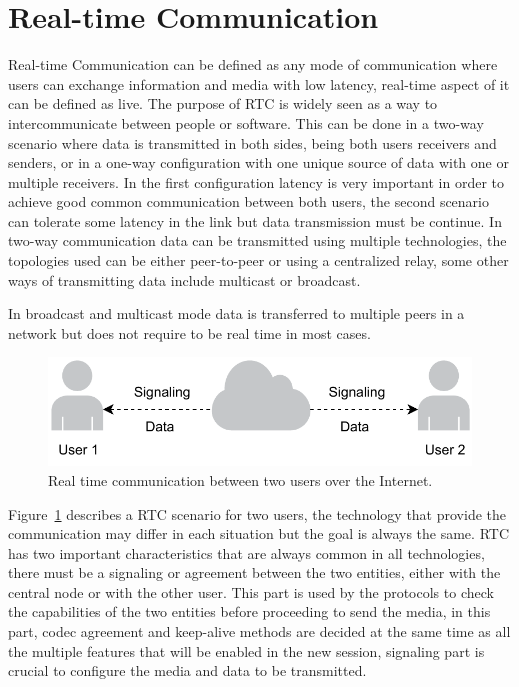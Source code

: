 \section{Real-time Communication}

\thispagestyle{empty}

Real-time Communication can be defined as any mode of communication where users can exchange information and media with low latency, real-time aspect of it can be defined as live. The purpose of RTC is widely seen as a way to intercommunicate between people or software. This can be done in a two-way scenario where data is transmitted in both sides, being both users receivers and senders, or in a one-way configuration with one unique source of data with one or multiple receivers. In the first configuration latency is very important in order to achieve good common communication between both users, the second scenario can tolerate some latency in the link but data transmission must be continue. In two-way communication data can be transmitted using multiple technologies, the topologies used can be either peer-to-peer or using a centralized relay, some other ways of transmitting data include multicast or broadcast.

In broadcast and multicast mode data is transferred to multiple peers in a network but does not require to be real time in most cases.

\begin{figure}[h]
  \centering
    \includegraphics[width=1\textwidth]{./figures/P2P.pdf}
      \caption[Real time communication between two users over the Internet]{Real time communication between two users over the Internet.}
	\label{fig:RTC}
\end{figure}

Figure~\ref{fig:RTC} describes a RTC scenario for two users, the technology that provide the communication may differ in each situation but the goal is always the same. RTC has two important characteristics that are always common in all technologies, there must be a signaling or agreement between the two entities, either with the central node or with the other user. This part is used by the protocols to check the capabilities of the two entities before proceeding to send the media, in this part, codec agreement and keep-alive methods are decided at the same time as all the multiple features that will be enabled in the new session, signaling part is crucial to configure the media and data to be transmitted. 

